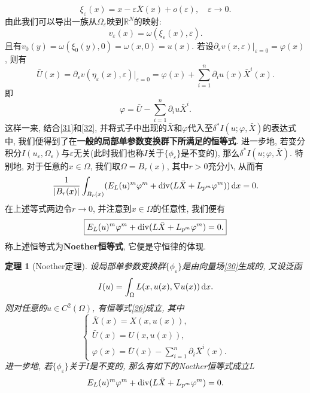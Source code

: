 \documentclass[12pt,a4paper]{article}
\newtheorem{theorem}{定理}[section]
\begin{document}
\begin{equation*}
    \xi_{\varepsilon}(x) = x - \varepsilon\bar{X}(x) + o(\varepsilon), \quad \varepsilon \rightarrow 0.
\end{equation*} 
由此我们可以导出一族从$\Omega_{\varepsilon}$映到$\mathbb{R}^N$的映射:
\begin{equation*}
    v_{\varepsilon}(x) = \omega(\xi_{\varepsilon}(x), \varepsilon). 
\end{equation*}
且有$v_0(y) = \omega(\xi_0(y), 0) = \omega(x, 0) = u(x)$. 若设$\partial_{\varepsilon}v(x, \varepsilon)|_{\varepsilon = 0} = \varphi(x)$, 则有  
\begin{equation*}
    \bar{U}(x) = \partial_{\varepsilon}v(\eta_{\varepsilon}(x), \varepsilon)|_{\varepsilon = 0} = \varphi(x) + \sum_{i = 1}^n\partial_iu(x)\bar{X}^i(x).
\end{equation*}
即 
\begin{equation}\label{32}
    \varphi = \bar{U} - \sum_{i = 1}^n\partial_iu\bar{X}^i. 
\end{equation}
这样一来, 结合\eqref{31}和\eqref{32}, 并将式子中出现的$\bar{X}$和$\varphi$代入至$\delta^*I(u; \varphi, \bar{X})$的表达式中, 我们便得到了在\textbf{一般的局部单参数变换群下所满足的恒等式}.
进一步地, 若变分积分$I(u_{\varepsilon}, \Omega_{\varepsilon})$与$\varepsilon$无关(此时我们也称$I$关于$\{\phi_{\varepsilon}\}$是不变的), 那么$\delta^*I(u; \varphi, \bar{X})$.
特别地, 对于任意的$x \in \Omega$,  我们取$\Omega = B_r(x)$, 其中$r > 0$充分小, 从而有
\begin{equation*}
    \frac{1}{|B_r(x)|}\int_{B_r(x)}(E_L(u)^m\varphi^m + {\rm div}(L\bar{X} + L_{p^m}\varphi^m)) \,{\rm d}x = 0.
\end{equation*}
在上述等式两边令$r \rightarrow 0$, 并注意到$x \in \Omega$的任意性, 我们便有
\begin{equation*}
    \boxed{E_L(u)^m\varphi^m + {\rm div}(L\bar{X} + L_{p^m}\varphi^m) = 0.}
\end{equation*}
称上述恒等式为\textbf{Noether恒等式}, 它便是守恒律的体现.

\begin{theorem}[Noether定理]
    设局部单参数变换群$\{\phi_{\varepsilon}\}$是由向量场\eqref{30}生成的, 又设泛函
    \begin{equation*}
        I(u) = \int_{\Omega}L(x, u(x), \nabla u(x)) \,{\rm d}x.
    \end{equation*}
    则对任意的$u \in C^2(\Omega)$, 有恒等式\eqref{26}成立, 其中
    \begin{equation*}
        \begin{cases} 
            \bar{X}(x) = X(x, u(x)), \\  
            \bar{U}(x) = U(x, u(x)), \\  
            \displaystyle \varphi(x) = \bar{U}(x)  - \sum_{i = 1}^n\partial_i\bar{X}^i(x).  
        \end{cases}
    \end{equation*}
    进一步地, 若$\{\phi_{\varepsilon}\}$关于$I$是不变的, 那么有如下的Noether恒等式成立L
    \begin{equation*}
        E_L(u)^m\varphi^m + {\rm div}(L\bar{X} + L_{p^m}\varphi^m) = 0.
    \end{equation*}
\end{theorem}
\end{document}
